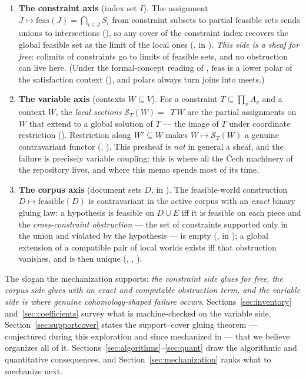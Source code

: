 \documentclass[11pt]{article}
\newcommand{\feas}{\mathrm{feas}}
\newcommand{\Sec}{\mathcal S}
\begin{document}
\begin{enumerate}
\item \textbf{The constraint axis} (index set $I$).  The assignment $J
  \mapsto \feas(J) = \bigcap_{i \in J} S_i$ from constraint subsets to
  partial feasible sets sends unions to intersections
  (), so any cover of the
  constraint index recovers the global feasible set as the limit of
  the local ones (, in
  ).  \emph{This side is a sheaf for free}: colimits
  of constraints go to limits of feasible sets, and no obstruction can
  live here.  (Under the formal-concept reading of
  , $\feas$ is a lower polar of the satisfaction
  context \citep{ganter1999fca}
  (), and polars always
  turn joins into meets.)
\item \textbf{The variable axis} (contexts $W \subseteq V$).  For a
  constraint $T \subseteq \prod_v A_v$ and a context $W$, the
  \emph{local sections} $\Sec_T(W) = $ $\,T\,W$
  are the partial assignments on $W$ that extend to a global solution
  of $T$ --- the image of $T$ under coordinate restriction
  ().  Restriction along $W' \subseteq W$
  makes $W \mapsto \Sec_T(W)$ a genuine contravariant functor
  (, ).  This
  presheaf is \emph{not} in general a sheaf, and the failure is
  precisely variable coupling: this is where all the \v{C}ech
  machinery of the repository lives, and where this memo spends most
  of its time.
\item \textbf{The corpus axis} (document sets $D$, in
  ).  The feasible-world construction $D
  \mapsto \mathrm{feasible}(D)$ is contravariant in the active corpus
  with an \emph{exact} binary gluing law: a hypothesis is feasible on
  $D \cup E$ iff it is feasible on each piece and the
  \emph{cross-constraint obstruction} --- the set of constraints
  supported only in the union and violated by the hypothesis ---
  is empty (, 
  in ); a global extension of a
  compatible pair of local worlds exists iff that obstruction
  vanishes, and is then unique
  (,
  , ).
\end{enumerate}

The slogan the mechanization supports: \emph{the constraint side glues
for free, the corpus side glues with an exact and computable
obstruction term, and the variable side is where genuine
cohomology-shaped failure occurs}.  Sections~\ref{sec:inventory}
and~\ref{sec:coefficients} survey what is machine-checked on the
variable side.  Section~\ref{sec:supportcover} states the
support--cover gluing theorem --- conjectured during this exploration
and since mechanized in  --- that we believe
organizes all of it.  Sections~\ref{sec:algorithms}--\ref{sec:quant} draw the
algorithmic and quantitative consequences, and
Section~\ref{sec:mechanization} ranks what to mechanize next.
\end{document}
